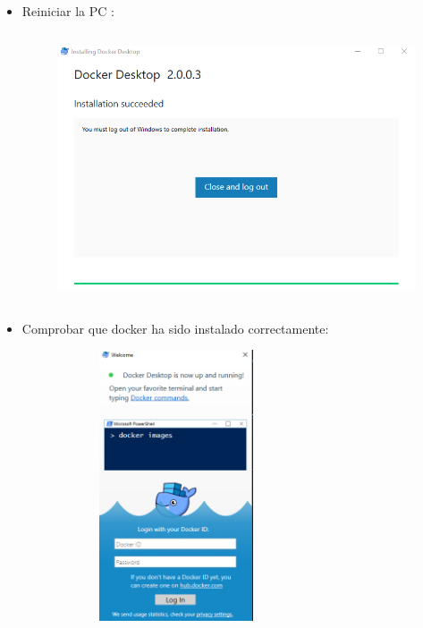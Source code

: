 \begin{itemize}
	\item Reiniciar la PC :\\
	\begin{figure}[htb]
	\begin{center}
	\includegraphics[width=18cm, height=8cm]{./Imagenes/dockerre}
	\end{center}
	\end{figure}
	
	\item Comprobar que docker ha sido instalado correctamente:\\	
	\begin{figure}[htb]
	\begin{center}
	\includegraphics[width=7cm, height=8cm]{./Imagenes/dockerrun}
	\end{center}
	\end{figure}\\		
		
	
	


\end{itemize}